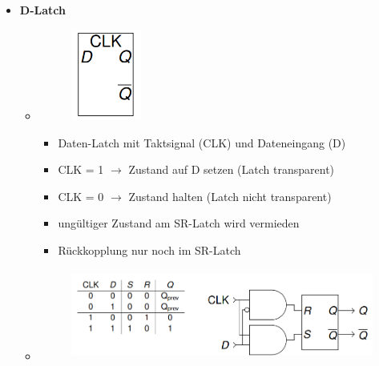 \documentclass[11pt,a4paper]{article}
\begin{document}
\begin{itemize}
\item \textbf{D-Latch}
	\begin{itemize}
	\item[]		
				\begin{minipage}{0.25\textwidth}
					\begin{figure}[H]
					\includegraphics[height=3cm]{dlatch1}
					\end{figure}
				\end{minipage}
				\begin{minipage}[t]{0.6\textwidth}
					\vspace{-1.25cm}
					\begin{itemize}
					\item Daten-Latch mit Taktsignal (CLK) und Dateneingang (D)
					\item CLK = 1 $\rightarrow$ Zustand auf D setzen (Latch transparent)
					\item CLK = 0 $\rightarrow$ Zustand halten (Latch nicht transparent)
					\item ungültiger Zustand am SR-Latch wird vermieden
					\item Rückkopplung nur noch im SR-Latch
					\end{itemize}
				\end{minipage}
				
	\item[] \begin{figure}[H]
				\begin{center}
				\includegraphics[height=3cm]{dlatch2}
				\end{center}
			\end{figure}
	 

\end{itemize}
\end{itemize}
\end{document}

